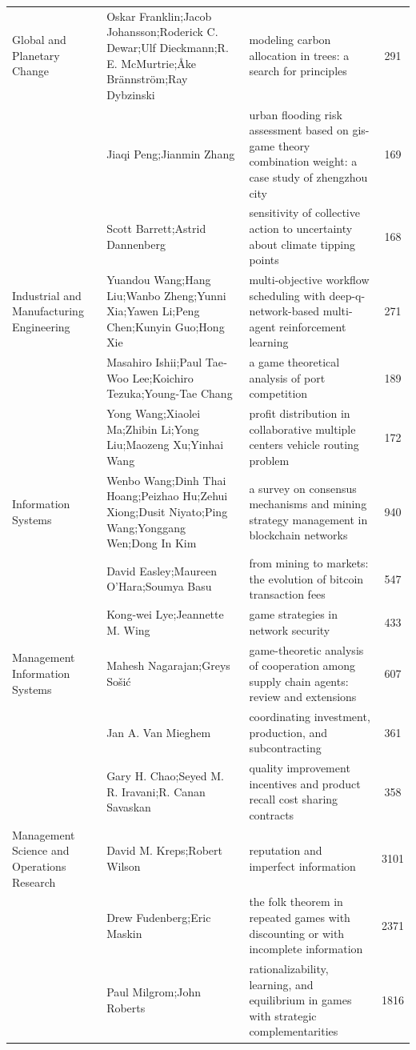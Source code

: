 \documentclass[
  12pt,
]{article}
\begin{document}
\begin{longtable}[t]{|>{\raggedright\arraybackslash}p{4cm}>{\raggedright\arraybackslash}p{4cm}>{\raggedright\arraybackslash}p{4cm}>{}c|}
Global and Planetary Change & Oskar Franklin;Jacob Johansson;Roderick C. Dewar;Ulf Dieckmann;R. E. McMurtrie;Åke Brännström;Ray Dybzinski & modeling carbon allocation in trees: a search for principles & 291\\
 & Jiaqi Peng;Jianmin Zhang & urban flooding risk assessment based on gis- game theory combination weight: a case study of zhengzhou city & 169\\
 & Scott Barrett;Astrid Dannenberg & sensitivity of collective action to uncertainty about climate tipping points & 168\\
Industrial and Manufacturing Engineering & Yuandou Wang;Hang Liu;Wanbo Zheng;Yunni Xia;Yawen Li;Peng Chen;Kunyin Guo;Hong Xie & multi-objective workflow scheduling with deep-q-network-based multi-agent reinforcement learning & 271\\
 & Masahiro Ishii;Paul Tae‐Woo Lee;Koichiro Tezuka;Young-Tae Chang & a game theoretical analysis of port competition & 189\\
 & Yong Wang;Xiaolei Ma;Zhibin Li;Yong Liu;Maozeng Xu;Yinhai Wang & profit distribution in collaborative multiple centers vehicle routing problem & 172\\
Information Systems & Wenbo Wang;Dinh Thai Hoang;Peizhao Hu;Zehui Xiong;Dusit Niyato;Ping Wang;Yonggang Wen;Dong In Kim & a survey on consensus mechanisms and mining strategy management in blockchain networks & 940\\
 & David Easley;Maureen O’Hara;Soumya Basu & from mining to markets: the evolution of bitcoin transaction fees & 547\\
 & Kong-wei Lye;Jeannette M. Wing & game strategies in network security & 433\\
Management Information Systems & Mahesh Nagarajan;Greys Sošić & game-theoretic analysis of cooperation among supply chain agents: review and extensions & 607\\
 & Jan A. Van Mieghem & coordinating investment, production, and subcontracting & 361\\
 & Gary H. Chao;Seyed M. R. Iravani;R. Canan Savaskan & quality improvement incentives and product recall cost sharing contracts & 358\\
Management Science and Operations Research & David M. Kreps;Robert Wilson & reputation and imperfect information & 3101\\
 & Drew Fudenberg;Eric Maskin & the folk theorem in repeated games with discounting or with incomplete information & 2371\\
 & Paul Milgrom;John Roberts & rationalizability, learning, and equilibrium in games with strategic complementarities & 1816\\

\end{longtable}
\end{document}
